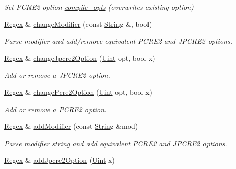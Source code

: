 \begin{DoxyCompactItemize}
\begin{DoxyCompactList}\small\item\em Set P\+C\+R\+E2 option \hyperlink{classjpcre2_1_1Regex_a5954131e9085de63229ed5c11417df69}{compile\+\_\+opts} (overwrites existing option) \end{DoxyCompactList}\item 
\hyperlink{classjpcre2_1_1Regex}{Regex} \& \hyperlink{classjpcre2_1_1Regex_a9ab3efed9819a51225456e6d8487de56_a9ab3efed9819a51225456e6d8487de56}{change\+Modifier} (const \hyperlink{namespacejpcre2_a91f03070152fb228bc116c5a737f1d16}{String} \&, bool)
\begin{DoxyCompactList}\small\item\em Parse modifier and add/remove equivalent P\+C\+R\+E2 and J\+P\+C\+R\+E2 options. \end{DoxyCompactList}\item 
\hyperlink{classjpcre2_1_1Regex}{Regex} \& \hyperlink{classjpcre2_1_1Regex_ab8e0b1a49eeb1077ba54cf3b5292c95e_ab8e0b1a49eeb1077ba54cf3b5292c95e}{change\+Jpcre2\+Option} (\hyperlink{namespacejpcre2_a078242d38221a13fb3543b9edd78c099}{Uint} opt, bool x)
\begin{DoxyCompactList}\small\item\em Add or remove a J\+P\+C\+R\+E2 option. \end{DoxyCompactList}\item 
\hyperlink{classjpcre2_1_1Regex}{Regex} \& \hyperlink{classjpcre2_1_1Regex_ae5bde8008cc5a700163ca3162dbd5823_ae5bde8008cc5a700163ca3162dbd5823}{change\+Pcre2\+Option} (\hyperlink{namespacejpcre2_a078242d38221a13fb3543b9edd78c099}{Uint} opt, bool x)
\begin{DoxyCompactList}\small\item\em Add or remove a P\+C\+R\+E2 option. \end{DoxyCompactList}\item 
\hyperlink{classjpcre2_1_1Regex}{Regex} \& \hyperlink{classjpcre2_1_1Regex_ab1af1471339602446d8221b8c97c6b55_ab1af1471339602446d8221b8c97c6b55}{add\+Modifier} (const \hyperlink{namespacejpcre2_a91f03070152fb228bc116c5a737f1d16}{String} \&mod)
\begin{DoxyCompactList}\small\item\em Parse modifier string and add equivalent P\+C\+R\+E2 and J\+P\+C\+R\+E2 options. \end{DoxyCompactList}\item 
\hyperlink{classjpcre2_1_1Regex}{Regex} \& \hyperlink{classjpcre2_1_1Regex_a03974fa7ba8f7c47186cb8d6f54934de_a03974fa7ba8f7c47186cb8d6f54934de}{add\+Jpcre2\+Option} (\hyperlink{namespacejpcre2_a078242d38221a13fb3543b9edd78c099}{Uint} x)

\end{DoxyCompactItemize}
